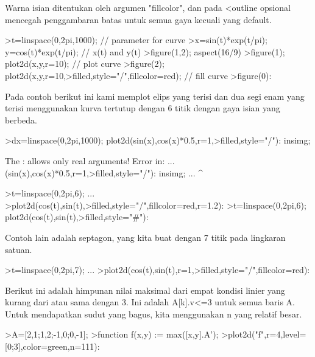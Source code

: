 \documentclass[a4paper,10pt]{article}
\begin{document}
\begin{eulernotebook}
\begin{eulercomment}
\begin{eulercomment}
\begin{eulercomment}
\begin{eulercomment}
\begin{eulercomment}
\begin{eulercomment}
\begin{eulercomment}
\begin{eulercomment}
\begin{eulercomment}
\begin{eulercomment}
\begin{eulercomment}
\begin{eulercomment}
\begin{eulercomment}
Warna isian ditentukan oleh argumen "fillcolor", dan pada \textless{}outline
opsional mencegah penggambaran batas untuk semua gaya kecuali yang
default.
\end{eulercomment}
\begin{eulerprompt}
>t=linspace(0,2pi,1000); // parameter for curve
>x=sin(t)*exp(t/pi); y=cos(t)*exp(t/pi); // x(t) and y(t)
>figure(1,2); aspect(16/9)
>figure(1); plot2d(x,y,r=10); // plot curve
>figure(2); plot2d(x,y,r=10,>filled,style="/",fillcolor=red); // fill curve
>figure(0):
\end{eulerprompt}
\begin{eulercomment}
Pada contoh berikut ini kami memplot elips yang terisi dan dua segi
enam yang terisi menggunakan kurva tertutup dengan 6 titik dengan gaya
isian yang berbeda.
\end{eulercomment}
\begin{eulerprompt}
>dx=linspace(0,2pi,1000); plot2d(sin(x),cos(x)*0.5,r=1,>filled,style="/"): insimg;
\end{eulerprompt}
\begin{euleroutput}
  The : allows only real arguments!
  Error in:
  ... (sin(x),cos(x)*0.5,r=1,>filled,style="/"): insimg; ...
                                                       ^
\end{euleroutput}
\begin{eulerprompt}
>t=linspace(0,2pi,6); ...
>plot2d(cos(t),sin(t),>filled,style="/",fillcolor=red,r=1.2):
>t=linspace(0,2pi,6); plot2d(cos(t),sin(t),>filled,style="#"):
\end{eulerprompt}
\begin{eulercomment}
Contoh lain adalah septagon, yang kita buat dengan 7 titik pada
lingkaran satuan.
\end{eulercomment}
\begin{eulerprompt}
>t=linspace(0,2pi,7);  ...
>plot2d(cos(t),sin(t),r=1,>filled,style="/",fillcolor=red):
\end{eulerprompt}
\begin{eulercomment}
Berikut ini adalah himpunan nilai maksimal dari empat kondisi linier
yang kurang dari atau sama dengan 3. Ini adalah A[k].v\textless{}=3 untuk semua
baris A. Untuk mendapatkan sudut yang bagus, kita menggunakan n yang
relatif besar.
\end{eulercomment}
\begin{eulerprompt}
>A=[2,1;1,2;-1,0;0,-1];
>function f(x,y) := max([x,y].A');
>plot2d("f",r=4,level=[0;3],color=green,n=111):
\end{eulerprompt}

\end{eulercomment}
\end{eulercomment}
\end{eulercomment}
\end{eulercomment}
\end{eulercomment}
\end{eulercomment}
\end{eulercomment}
\end{eulercomment}
\end{eulercomment}
\end{eulercomment}
\end{eulercomment}
\end{eulercomment}
\end{eulernotebook}
\end{document}

